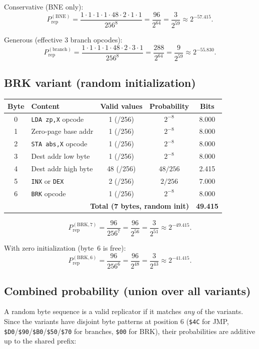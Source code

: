 \documentclass{article}
\newcommand{\hex}[1]{\texttt{\$#1}}
\newcommand{\opcode}[1]{\texttt{#1}}
\newcommand{\Prep}{P_{\mathrm{rep}}}
\begin{document}
Conservative (BNE only):
\[
  \Prep^{(\mathrm{BNE})} = \frac{1 \cdot 1 \cdot 1 \cdot 1 \cdot 48 \cdot 2 \cdot 1 \cdot 1}{256^8}
  = \frac{96}{2^{64}} = \frac{3}{2^{59}} \approx 2^{-57.415}.
\]

Generous (effective 3 branch opcodes):
\[
  \Prep^{(\mathrm{branch})} = \frac{1 \cdot 1 \cdot 1 \cdot 1 \cdot 48 \cdot 2 \cdot 3 \cdot 1}{256^8}
  = \frac{288}{2^{64}} = \frac{9}{2^{59}} \approx 2^{-55.830}.
\]

\subsection{BRK variant (random initialization)}

\begin{center}
\begin{tabular}{clccc}
\toprule
Byte & Content & Valid values & Probability & Bits \\
\midrule
0 & \opcode{LDA zp,X} opcode & 1 (/256) & $2^{-8}$ & 8.000 \\
1 & Zero-page base addr & 1 (/256) & $2^{-8}$ & 8.000 \\
2 & \opcode{STA abs,X} opcode & 1 (/256) & $2^{-8}$ & 8.000 \\
3 & Dest addr low byte & 1 (/256) & $2^{-8}$ & 8.000 \\
4 & Dest addr high byte & 48 (/256) & $48/256$ & 2.415 \\
5 & \opcode{INX} or \opcode{DEX} & 2 (/256) & $2/256$ & 7.000 \\
6 & \opcode{BRK} opcode & 1 (/256) & $2^{-8}$ & 8.000 \\
\midrule
\multicolumn{4}{r}{\textbf{Total (7 bytes, random init)}} & \textbf{49.415} \\
\bottomrule
\end{tabular}
\end{center}

\[
  \Prep^{(\mathrm{BRK,7})} = \frac{96}{256^7} = \frac{96}{2^{56}} = \frac{3}{2^{51}} \approx 2^{-49.415}.
\]

With zero initialization (byte~6 is free):
\[
  \Prep^{(\mathrm{BRK,6})} = \frac{96}{256^6} = \frac{96}{2^{48}} = \frac{3}{2^{43}} \approx 2^{-41.415}.
\]

\subsection{Combined probability (union over all variants)}

A random byte sequence is a valid replicator if it matches \emph{any}
of the variants. Since the variants have disjoint byte patterns at
position 6 (\hex{4C} for JMP, \hex{D0}/\hex{90}/\hex{B0}/\hex{50}/\hex{70}
for branches, \hex{00} for BRK), their probabilities are additive up to
the shared prefix:
\end{document}
